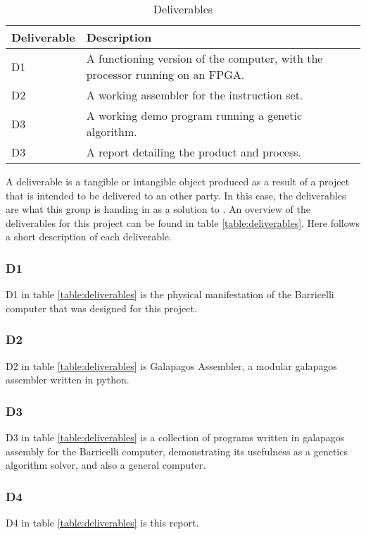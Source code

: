  \begin{table}[h]
 \begin{center}
 \begin{tabular}{| l | p{\textwidth} |}
 \hline
 Deliverable & Description \\
 \hline
 D1 & A functioning version of the computer, with the processor running on an FPGA.\\
 D2 & A working assembler for the instruction set.\\
 D3 & A working demo program running a genetic algorithm.\\
 D3 & A report detailing the product and process.\\
 \hline
 \end{tabular}
 \caption{Deliverables}
 \label{table:deliverables}
 \end{center}
 \end{table}

A deliverable is a tangible or intangible object produced as a result of a project that is intended to be delivered to an other party.
In this case, the deliverables are what this group is handing in as a solution to .
An overview of the deliverables for this project can be found in table \vref{table:deliverables}.
Here follows a short description of each deliverable.

\subsubsection{D1}

D1 in table \vref{table:deliverables} is the physical manifestation of the Barricelli computer that was designed for this project.

\subsubsection{D2}

D2 in table \vref{table:deliverables} is Galapagos Assembler, a modular \gls{galapagos} assembler written in python.

\subsubsection{D3}

D3 in table \vref{table:deliverables} is a collection of programs written in galapagos assembly for the Barricelli computer, demonstrating its usefulness as a genetics algorithm solver, and also a general computer.

\subsubsection{D4}

D4 in table \vref{table:deliverables} is this report.

